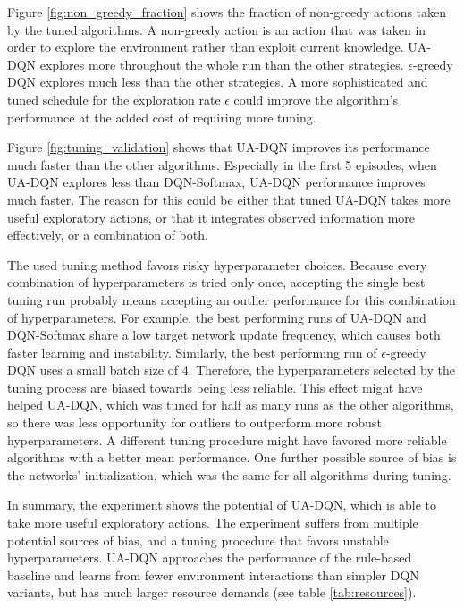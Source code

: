 Figure \ref{fig:non_greedy_fraction} shows the fraction of non-greedy actions taken by the tuned algorithms.
A non-greedy action is an action that was taken in order to explore the environment rather than exploit current knowledge.
UA-DQN explores more throughout the whole run than the other strategies.
$\epsilon$-greedy DQN explores much less than the other strategies.
A more sophisticated and tuned schedule for the exploration rate $\epsilon$ could improve the algorithm's performance at the added cost of requiring more tuning.

Figure \ref{fig:tuning_validation} shows that UA-DQN improves its performance much faster than the other algorithms.
Especially in the first 5 episodes, when UA-DQN explores less than DQN-Softmax, UA-DQN performance improves much faster.
The reason for this could be either that tuned UA-DQN takes more useful exploratory actions, or that it integrates observed information more effectively, or a combination of both.

The used tuning method favors risky hyperparameter choices.
Because every combination of hyperparameters is tried only once, accepting the single best tuning run probably means accepting an outlier performance for this combination of hyperparameters.
For example, the best performing runs of UA-DQN and DQN-Softmax share a low target network update frequency, which causes both faster learning and instability. Similarly, the best performing run of $\epsilon$-greedy DQN uses a small batch size of 4.
Therefore, the hyperparameters selected by the tuning process are biased towards being less reliable.
This effect might have helped UA-DQN, which was tuned for half as many runs as the other algorithms, so there was less opportunity for outliers to outperform more robust hyperparameters.
A different tuning procedure might have favored more reliable algorithms with a better mean performance.
One further possible source of bias is the networks' initialization, which was the same for all algorithms during tuning.

In summary, the experiment shows the potential of UA-DQN, which is able to take more useful exploratory actions.
The experiment suffers from multiple potential sources of bias, and a tuning procedure that favors unstable hyperparameters.
UA-DQN approaches the performance of the rule-based baseline and learns from fewer environment interactions than simpler DQN variants, but has much larger resource demands (see table \ref{tab:resources}).


